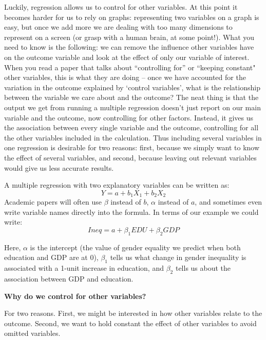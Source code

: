 \documentclass{book}
\newenvironment{shaded*}{
    \begin{center}
    \begin{tabular}{|p{0.9\textwidth}|}
    \hline\\
    }
    { 
    \\\\\hline
    \end{tabular} 
    \end{center}
}
\begin{document}
Luckily, regression allows us to control for other variables. At this point it
becomes harder for us to rely on graphs: representing two variables on a graph
is easy, but once we add more we are dealing with too many dimensions to
represent on a screen (or grasp with a human brain, at some point!). What you
need to know is the following: we can remove the influence other variables
have on the outcome variable and look at the effect of only our variable of
interest. When you read a paper that talks about ``controlling for'' or
``keeping constant" other variables, this is what they are doing -- once we
have accounted for the variation in the outcome explained by `control
variables', what is the relationship between the variable we care about and
the outcome? The neat thing is that the output we get from running a multiple
regression doesn't just report on our main variable and the outcome, now
controlling for other factors. Instead, it gives us the association between
every single variable and the outcome, controlling for all the other variables
included in the calculation. Thus including several variables in one
regression is desirable for two reasons: first, because we simply want to know
the effect of several variables, and second, because leaving out relevant
variables would give us less accurate results.

A multiple regression with two explanatory variables can be written as:
\[Y = a + b_{1}X_{1} + b_{2}X_{2}\] Academic papers will often use \(\beta\)
instead of \(b\), \(\alpha\) instead of \(a\), and sometimes even write
variable names directly into the formula. In terms of our example we could
write: \[Ineq = a + \beta_{1}EDU + \beta_{2}GDP\]

Here, \(\alpha\) is the intercept (the value of gender equality we predict
when both education and GDP are at \(0\)), \(\beta_1\) tells us what change in
gender inequality is associated with a 1-unit increase in education, and
\(\beta_2\) tells us about the association between GDP and education.

\textbf{Why do we control for other variables?}

\begin{shaded*}

For two reasons. First, we might be interested in how other variables relate
to the outcome. Second, we want to hold constant the effect of other variables
to avoid omitted variables.

\end{shaded*}
\end{document}

